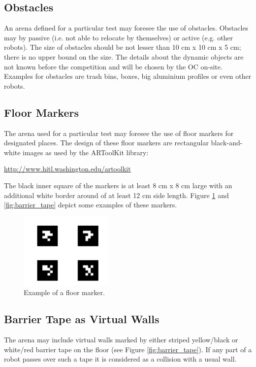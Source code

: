 \subsection{Obstacles}
An arena defined for a particular test may foresee the use of obstacles. Obstacles may by passive (i.e. not able to relocate by themselves) or active (e.g. other robots). The size of obstacles should be not lesser than 10 cm x 10 cm x 5 cm; there is no upper bound on the size. The details about the dynamic objects are not known before the competition and will be chosen by the OC on-site. Examples for obstacles are trash bins, boxes, big aluminium profiles or even other robots.

\subsection{Floor Markers}
The arena used for a particular test may foresee the use of floor markers for designated places. The design of these floor markers are rectangular black-and-white images as used by the ARToolKit library:
\begin{center}
\url{http://www.hitl.washington.edu/artoolkit}
\end{center}

The black inner square of the markers is at least 8 cm x 8 cm large with an additional white border around of at least 12 cm side length. Figure \ref{fig:floor_marker} and \ref{fig:barrier_tape} depict some examples of these markers.

\begin{figure} [h!]
\centering
\includegraphics[width= 0.4\textwidth ]{./images/example_floor_marker.png}
\caption{Example of a floor marker.}
\label{fig:floor_marker}
\end{figure}



\subsection{Barrier Tape as Virtual Walls}
The arena may include virtual walls marked by either striped yellow/black or white/red barrier tape on the floor (see Figure \ref{fig:barrier_tape}). If any part of a robot passes over such a tape it is considered as a collision with a usual wall.

